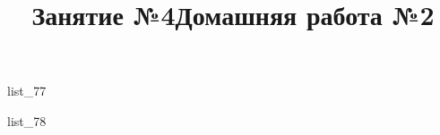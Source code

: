 \documentclass[12pt, a4paper]{article}
\begin{document}
	\title{Занятие №4}
	{list_77}
	\title{Домашняя работа №2}
	{list_78}
\end{document}
